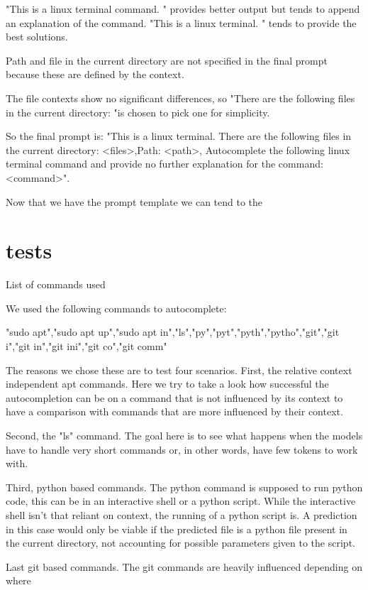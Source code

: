 "This is a linux terminal command. " provides better output but tends to append an explanation of the command. "This is a linux terminal. " tends to provide the best solutions. 



Path and file in the current directory are not specified in the final prompt because these are defined by the context.


The file contexts show no significant differences, so "There are the following files in the current  directory: "is chosen to pick one for simplicity.



So the final prompt is: "This is a linux terminal. There are the following files in the current  directory: <files>,Path: <path>, Autocomplete the following linux terminal command and provide no further explanation for the command: <command>".


Now that we have the prompt template we can tend to the 

\section{tests}
List of commands used

We used the following commands to autocomplete:

"sudo apt","sudo apt up","sudo apt in","ls","py","pyt","pyth","pytho","git","git i","git in","git ini","git co","git comm"


The reasons we chose these are to test four scenarios. First, the relative context independent apt commands. Here we try to take a look how successful the autocompletion can be on a command that is not influenced by its context to have a comparison with commands that are more influenced by their context.


Second, the  "ls" command. The goal here is to see what happens when the models have to handle very short commands or, in other words, have few tokens to work with.


Third, python based commands. The python command is supposed to run python code, this can be in an interactive shell or a python script. While the interactive shell isn't that reliant on context, the running of a python script is. A prediction in this case would only be viable if the predicted file is a python file present in the current directory, not accounting for possible parameters given to the script.



Last git based commands. The git commands are heavily influenced depending on where 

